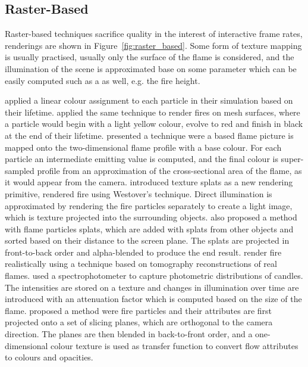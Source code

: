 \subsection{Raster-Based}
\label{sec:raster_based}

Raster-based techniques sacrifice quality in the interest of interactive frame rates, renderings are shown in Figure~\ref{fig:raster_based}.
Some form of texture mapping is usually practised, usually only the surface of the flame is considered, and the illumination of the scene is approximated base on some parameter which can be easily computed such as a as well, e.g. the fire height.

\cite{Reeves:1983} applied a linear colour assignment to each particle in their simulation based on their lifetime.
\cite{Lee:2001} applied the same technique to render fires on mesh surfaces, where a particle would begin with a light yellow colour, evolve to red and finish in black at the end of their lifetime.
\cite{Lamorlette:2002} presented a technique were a based flame picture is mapped onto the two-dimensional flame profile with a base colour.
For each particle an intermediate emitting value is computed, and the final colour is super-sampled profile from an approximation of the cross-sectional area of the flame, as it would appear from the camera.
\cite{Westover:1990} introduced texture splats as a new rendering primitive, \cite{Wei:2002} rendered fire using Westover's technique.
Direct illumination is approximated by rendering the fire particles separately to create a light image, which is texture projected into the surrounding objects.
\cite{Zhao:2003} also proposed a method with flame particles splats, which are added with splats from other objects and sorted based on their distance to the screen plane.
The splats are projected in front-to-back order and alpha-blended to produce the end result.
\cite{Ihrke:2004} render fire realistically using a technique based on tomography reconstructions of real flames. 
\cite{Bridault:2006} used a spectrophotometer to capture photometric distributions of candles.
The intensities are stored on a texture and changes in illumination over time are introduced with an attenuation factor which is computed based on the size of the flame.
\cite{Zhang:2011} proposed a method were fire particles and their attributes are first projected onto a set of slicing planes, which are orthogonal to the camera direction. 
The planes are then blended in back-to-front order, and a one-dimensional colour texture is used as transfer function to convert flow attributes to colours and opacities.

